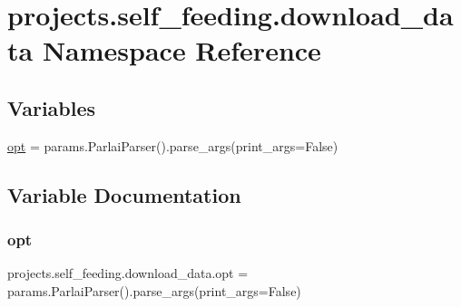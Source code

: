 \hypertarget{namespaceprojects_1_1self__feeding_1_1download__data}{}\section{projects.\+self\+\_\+feeding.\+download\+\_\+data Namespace Reference}
\label{namespaceprojects_1_1self__feeding_1_1download__data}
\subsection*{Variables}
\begin{DoxyCompactItemize}
\item 
\hyperlink{namespaceprojects_1_1self__feeding_1_1download__data_a3a83021b7f75b0049b614777fa616568}{opt} = params.\+Parlai\+Parser().parse\+\_\+args(print\+\_\+args=False)
\end{DoxyCompactItemize}


\subsection{Variable Documentation}
\mbox{\label{namespaceprojects_1_1self__feeding_1_1download__data_a3a83021b7f75b0049b614777fa616568}} 
\subsubsection{\texorpdfstring{opt}{opt}}
{\footnotesize\ttfamily projects.\+self\+\_\+feeding.\+download\+\_\+data.\+opt = params.\+Parlai\+Parser().parse\+\_\+args(print\+\_\+args=False)}

